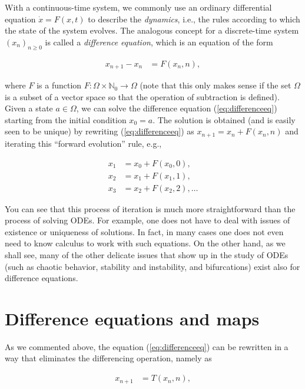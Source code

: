 \documentclass[11pt]{report}
\theoremstyle{plain}
\theoremstyle{definition}
\begin{document}
With a continuous-time system, we commonly use an
ordinary differential equation $\dot{x}=F(x,t)$ to
describe the \emph{dynamics}, i.e., the rules according to
which the state of the system evolves. The analogous
concept for a discrete-time system $(x_n)_{n\ge 0}$
is called a \emph{difference equation}, which is an
equation of the form

\begin{equation*} \tag{29}\label{eq:differenceeq}
\begin{split}
x_{n+1}-x_n &= F(x_n, n),
\end{split}
\end{equation*}

where $F$ is a function
$F:\Omega\times \mathbb{N}_0\to\Omega$ (note that
this only makes sense if the set $\Omega$ is a subset
of a vector space so that the operation of subtraction
is defined). Given a state $a \in \Omega$, we can
solve the difference equation (\ref{eq:differenceeq})
starting from the initial condition $x_0=a$. The
solution is obtained (and is easily seen to be unique)
by rewriting (\ref{eq:differenceeq}) as
$x_{n+1}=x_n+F(x_n,n)$ and iterating this ``forward
evolution'' rule, e.g.,

\begin{align*}
x_1 &= x_0 + F(x_0,0), \\ x_2&= x_1+F(x_1,1), \\ x_3&=x_2+F(x_2,2), \ldots
\end{align*}

You can see that this process of iteration is much
more straightforward than the process of solving ODEs.
For example, one does not have to deal with issues of
existence or uniqueness of solutions. In fact, in many
cases one does not even need to know calculus to work
with such equations. On the other hand, as we shall
see, many of the other delicate issues that show up in
the study of ODEs (such as chaotic behavior, stability
and instability, and bifurcations) exist also for
difference equations.

\section{Difference equations and maps}
As we commented above, the equation
(\ref{eq:differenceeq}) can be rewritten in a way that
eliminates the differencing operation, namely as

\begin{equation*} \tag{30}\label{eq:differenceeq-map}
\begin{split}
x_{n+1} &= T(x_n,n),
\end{split}
\end{equation*}
\end{document}
